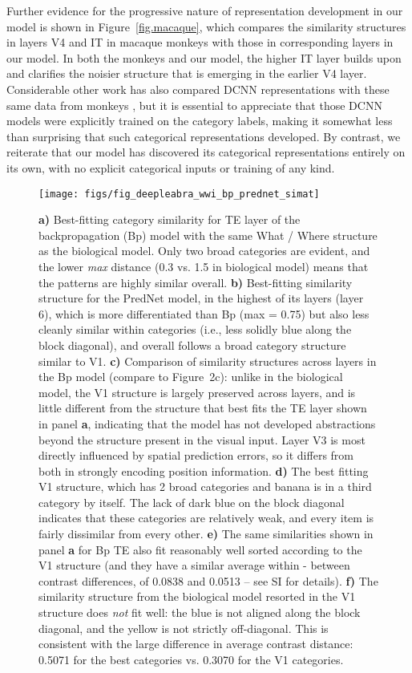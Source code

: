 \documentclass[11pt,twoside]{article}
\newif\myifpdf
\begin{document}
Further evidence for the progressive nature of representation development in our model is shown in Figure~\ref{fig.macaque}, which compares the similarity structures in layers V4 and IT in macaque monkeys \cite{CadieuHongYaminsEtAl14} with those in corresponding layers in our model.  In both the monkeys and our model, the higher IT layer builds upon and clarifies the noisier structure that is emerging in the earlier V4 layer.  Considerable other work has also compared DCNN representations with these same data from monkeys \cite{CadieuHongYaminsEtAl14}, but it is essential to appreciate that those DCNN models were explicitly trained on the category labels, making it somewhat less than surprising that such categorical representations developed.  By contrast, we reiterate that our model has discovered its categorical representations entirely on its own, with no explicit categorical inputs or training of any kind.

\begin{figure}
  \centering\texttt{[image: figs/fig\_deepleabra\_wwi\_bp\_prednet\_simat]}
  \caption{{\bf a)} Best-fitting category similarity for TE layer of the backpropagation (Bp) model with the same What / Where structure as the biological model.  Only two broad categories are evident, and the lower \emph{max} distance (0.3 vs. 1.5 in biological model) means that the patterns are highly similar overall.  {\bf b)} Best-fitting similarity structure for the PredNet model, in the highest of its layers (layer 6), which is more differentiated than Bp (max = 0.75) but also less cleanly similar within categories (i.e., less solidly blue along the block diagonal), and overall follows a broad category structure similar to V1.  {\bf c)} Comparison of similarity structures across layers in the Bp model (compare to Figure~2c): unlike in the biological model, the V1 structure is largely preserved across layers, and is little different from the structure that best fits the TE layer shown in panel {\bf a}, indicating that the model has not developed abstractions beyond the structure present in the visual input.  Layer V3 is most directly influenced by spatial prediction errors, so it differs from both in strongly encoding position information.  {\bf d)} The best fitting V1 structure, which has 2 broad categories and banana is in a third category by itself.  The lack of dark blue on the block diagonal indicates that these categories are relatively weak, and every item is fairly dissimilar from every other.  {\bf e)} The same similarities shown in panel {\bf a} for Bp TE also fit reasonably well sorted according to the V1 structure (and they have a similar average within - between contrast differences, of 0.0838 and 0.0513 -- see SI for details).  {\bf f)} The similarity structure from the biological model resorted in the V1 structure does \emph{not} fit well: the blue is not aligned along the block diagonal, and the yellow is not strictly off-diagonal.  This is consistent with the large difference in average contrast distance: 0.5071 for the best categories vs. 0.3070 for the V1 categories.}
  \label{fig.bpred}
\end{figure}
\end{document}

